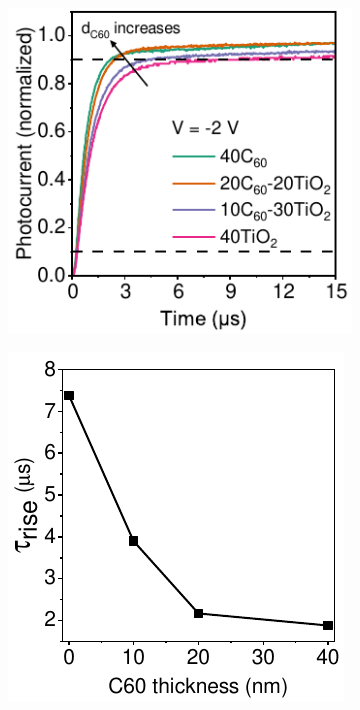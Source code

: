 \begin{figure}[ht!]
    \centering
    \begin{subfigure}[t]{0.4\textwidth}
        \centering
        \includegraphics[width=\textwidth]{chapters/transport_layers/images/TPC_comparison_v2.pdf} %
        \caption{}
        \label{}
    \end{subfigure}
    \hspace{0.5cm}
    \begin{subfigure}[t]{0.37\textwidth}
        \centering
        \includegraphics[width=\textwidth]{chapters/transport_layers/images/Rise_time_f_c60_thickness.pdf} 
        \caption{}
        \label{}
    \end{subfigure} 
 

\end{figure}
